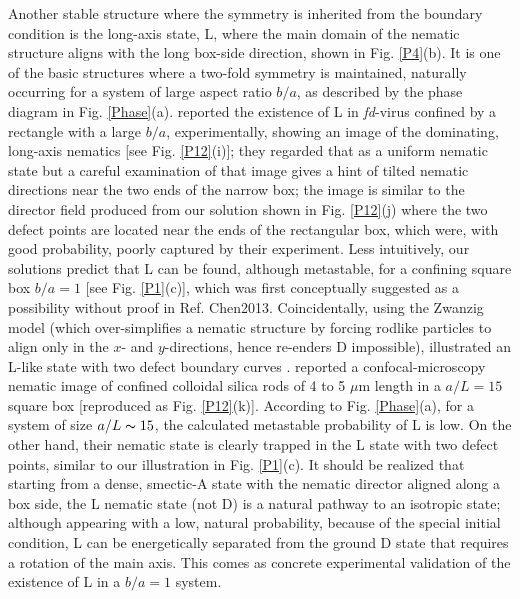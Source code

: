 \documentclass[prl,twocolumn,preprintnumbers,reprint]{revtex4}
\newcommand*{\citen}{}%
\DeclareRobustCommand*{\citen}[1]{%
  \begingroup
    \romannumeral-`\x %
    \setcitestyle{numbers}%
    \cite{#1}%
  \endgroup
}
\begin{document}
Another stable structure where the symmetry is inherited from the boundary condition is the long-axis state, L, where the main domain of the nematic structure aligns with the long box-side direction, shown in Fig. \ref{P4}(b). It is one of the basic structures where a two-fold symmetry is maintained, naturally occurring for a system of large aspect ratio $b/a$, as described by the phase diagram in Fig. \ref{Phase}(a).
\citeauthor{Lewis2014} reported the existence of L in {\it fd}-virus confined
by a rectangle
with a large $b/a$, experimentally, showing an image of the dominating, long-axis nematics \cite{Lewis2014}[see Fig. \ref{P12}(i)]; they regarded that as a uniform nematic state but a careful examination of that image gives a hint of tilted nematic directions near the two ends of the narrow box; the image is similar to the director field produced from our solution shown in Fig. \ref{P12}(j) where the two defect points are located near the ends of the rectangular box, which were, with good probability, poorly captured by their experiment. Less intuitively, our solutions predict that L can be found, although metastable, for a confining square box $b/a=1$ [see Fig. \ref{P1}(c)], which was first conceptually suggested as a possibility without proof in Ref. \citen{Chen2013}. Coincidentally, using the Zwanzig model \cite{Zwanzig1963} (which over-simplifies a nematic structure by forcing rodlike particles to align only in the $x$- and $y$-directions, hence re-enders D impossible),
 \citeauthor{Pinto2013} illustrated an L-like state with two defect boundary curves \cite{Pinto2013}.
\citeauthor{Cortes2017} reported a confocal-microscopy nematic image of confined colloidal silica rods of 4 to 5 $\mu$m length in a $a/L=15$ square box [reproduced as Fig. \ref{P12}(k)]. According to Fig. \ref{Phase}(a), for a system of size $a/L \thicksim 15$,
the calculated metastable probability of L is low. On the other hand, their nematic state is clearly trapped in the L state with two defect points, similar to our illustration in Fig. \ref{P1}(c). It should be realized that starting from a dense, smectic-A state with the nematic director aligned along a box side, the L nematic state (not D) is a natural pathway to an isotropic state; although appearing with a low, natural probability,  because of the special initial condition, L can be energetically separated from the ground D state that requires a rotation of the main axis. This comes as concrete experimental validation of the existence of L in a $b/a=1$ system.
\end{document}
